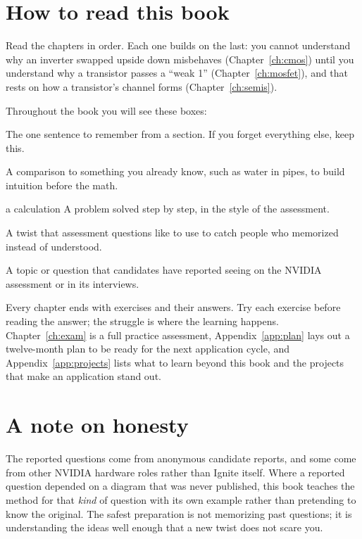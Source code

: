 \section*{How to read this book}

Read the chapters in order. Each one builds on the last: you cannot understand why an inverter swapped upside down misbehaves (Chapter~\ref{ch:cmos}) until you understand why a transistor passes a ``weak 1'' (Chapter~\ref{ch:mosfet}), and that rests on how a transistor's channel forms (Chapter~\ref{ch:semis}).

Throughout the book you will see these boxes:

\begin{bigidea}
The one sentence to remember from a section. If you forget everything else, keep this.
\end{bigidea}

\begin{everyday}
A comparison to something you already know, such as water in pipes, to build intuition before the math.
\end{everyday}

\begin{worked}{a calculation}
A problem solved step by step, in the style of the assessment.
\end{worked}

\begin{trap}
A twist that assessment questions like to use to catch people who memorized instead of understood.
\end{trap}

\begin{onoa}
A topic or question that candidates have reported seeing on the NVIDIA assessment or in its interviews.
\end{onoa}

Every chapter ends with exercises and their answers. Try each exercise before reading the answer; the struggle is where the learning happens. Chapter~\ref{ch:exam} is a full practice assessment, Appendix~\ref{app:plan} lays out a twelve-month plan to be ready for the next application cycle, and Appendix~\ref{app:projects} lists what to learn beyond this book and the projects that make an application stand out.

\section*{A note on honesty}

The reported questions come from anonymous candidate reports, and some come from other NVIDIA hardware roles rather than Ignite itself. Where a reported question depended on a diagram that was never published, this book teaches the method for that \emph{kind} of question with its own example rather than pretending to know the original. The safest preparation is not memorizing past questions; it is understanding the ideas well enough that a new twist does not scare you.
